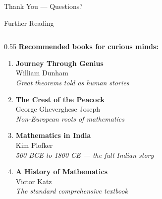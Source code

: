 \begin{frame}[shrink=25]{Thank You --- Questions?}
  \vspace{1em}

  \begin{center}
  \end{center}

\end{frame}

\begin{frame}[shrink=25]{Further Reading}

  \begin{columns}[T]
    \begin{column}{0.55\textwidth}
      {\normalsize\bfseries Recommended books for curious minds:}

      \vspace{0.5em}
      \begin{enumerate}\setlength\itemsep{5pt}
        \item[\textcolor{digitalBlue}{\faBookOpen}]
          \textbf{Journey Through Genius}\\
          {\small William Dunham}\\
          {\scriptsize\itshape Great theorems told as human stories}

        \item[\textcolor{digitalBlue}{\faBookOpen}]
          \textbf{The Crest of the Peacock}\\
          {\small George Gheverghese Joseph}\\
          {\scriptsize\itshape Non-European roots of mathematics}

        \item[\textcolor{digitalBlue}{\faBookOpen}]
          \textbf{Mathematics in India}\\
          {\small Kim Plofker}\\
          {\scriptsize\itshape 500 BCE to 1800 CE --- the full Indian story}

        \item[\textcolor{digitalBlue}{\faBookOpen}]
          \textbf{A History of Mathematics}\\
          {\small Victor Katz}\\
          {\scriptsize\itshape The standard comprehensive textbook}


\end{enumerate}
\end{column}
\end{columns}
\end{frame}
